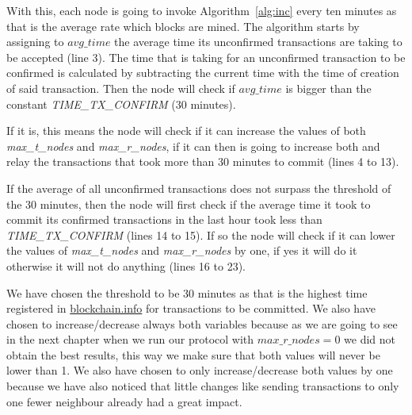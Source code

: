 

With this, each node is going to invoke Algorithm~\ref{alg:inc} every ten minutes as that is the average rate which blocks are mined. The algorithm starts by assigning to $avg\_time$ the average time its unconfirmed transactions are taking to be accepted (line 3). The time that is taking for an unconfirmed transaction to be confirmed is calculated by subtracting the current time with the time of creation of said transaction. Then the node will check if $avg\_time$ is bigger than the constant \textsl{TIME\_TX\_CONFIRM} (30 minutes). 

If it is, this means the node will check if it can increase the values of both \textsl{max\_t\_nodes} and \textsl{max\_r\_nodes}, if it can then is going to increase both and relay the transactions that took more than 30 minutes to commit (lines 4 to 13).

If the average of all unconfirmed transactions does not surpass the threshold of the 30 minutes, then the node will first check if the average time it took to commit its confirmed transactions in the last hour took less than \textsl{TIME\_TX\_CONFIRM} (lines 14 to 15). If so the node will check if it can lower the values of \textsl{max\_t\_nodes} and \textsl{max\_r\_nodes} by one, if yes it will do it otherwise it will not do anything (lines 16 to 23). 

We have chosen the threshold to be 30 minutes as that is the highest time registered in \url{blockchain.info} for transactions to be committed. We also have chosen to increase/decrease always both variables because as we are going to see in the next chapter when we run our protocol with $max\_r\_nodes = 0$ we did not obtain the best results, this way we make sure that both values will never be lower than 1. We also have chosen to only increase/decrease both values by one because we have also noticed that little changes like sending transactions to only one fewer neighbour already had a great impact.

